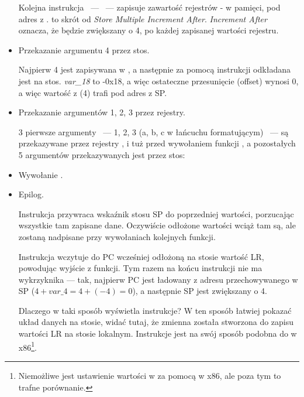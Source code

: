 \begin{itemize}
Kolejna instrukcja ~---  ~--- zapisuje zawartość rejestrów - w pamięci, pod adres z .
 to skrót od \emph{Store Multiple Increment After}.
\emph{Increment After} oznacza, że  będzie zwiększany o 4, po każdej zapisanej wartości rejestru.

\item Przekazanie argumentu 4 przez stos.

Najpierw 4 jest zapisywana w , a następnie za pomocą instrukcji  odkładana jest na stos.
\emph{var\_18} to -0x18, a więc ostateczne przesunięcie (offset) wynosi 0, a więc wartość z  (4) trafi pod adres z \ac{SP}.

\item Przekazanie argumentów 1, 2, 3 przez rejestry.

3 pierwsze argumenty ~--- 1, 2, 3 (a, b, c w łańcuchu formatującym) ~--- są przekazywane przez rejestry ,  i 
tuż przed wywołaniem funkcji \printf, a pozostałych 5 argumentów przekazywanych jest przez stos:

\item Wywołanie \printf.

\item Epilog.

Instrukcja  przywraca wskaźnik stosu \ac{SP} do poprzedniej wartości,
porzucając wszystkie tam zapisane dane.
Oczywiście odłożone wartości wciąż tam są, ale zostaną nadpisane przy wywołaniach kolejnych funkcji.

Instrukcja  wczytuje do \ac{PC} wcześniej odłożoną na stosie wartość \ac{LR}, powodując wyjście z funkcji.
Tym razem na końcu instrukcji nie ma wykrzyknika --- tak, najpierw \ac{PC} jest ładowany z adresu przechowywanego w \ac{SP}
($4+var\_4=4+(-4)=0$), a następnie \ac{SP} jest zwiększany o 4.


Dlaczego \IDA w taki sposób wyświetla instrukcje?
W ten sposób łatwiej pokazać układ danych na stosie, widać tutaj, że zmienna  została stworzona do zapisu wartości \ac{LR} na stosie lokalnym.
Instrukcje jest na swój sposób podobna do  w x86\footnote{Niemożliwe jest ustawienie wartości w  za pomocą \POP w x86, ale poza tym to trafne porównanie.}.

\end{itemize}

